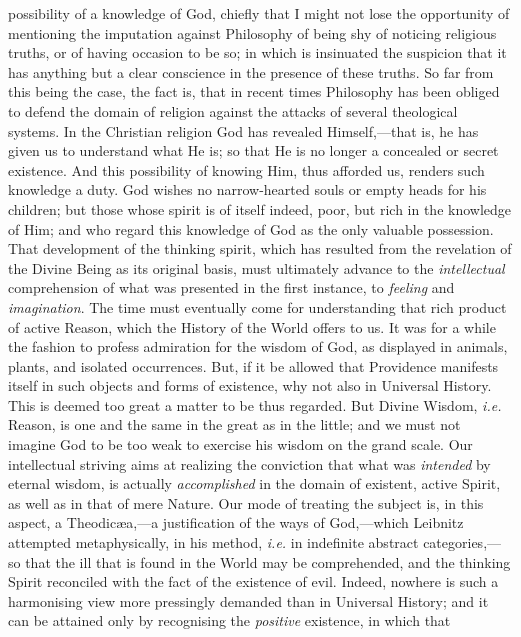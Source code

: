 possibility of a knowledge of God, chiefly that I might not lose the
opportunity of mentioning the imputation against Philosophy of being
shy of noticing religious truths, or of having occasion to be so; in
which is insinuated the suspicion that it has anything but a clear
conscience in the presence of these truths. So far from this being the
case, the fact is, that in recent times Philosophy has been obliged to
defend the domain of religion against the attacks of several
theological systems. In the Christian religion God has revealed
Himself,---that is, he has given us to understand what He is; so that
He is no longer a concealed or secret existence. And this possibility
of knowing Him, thus afforded us, renders such knowledge a duty. God
wishes no narrow-hearted souls or empty heads for his children; but
those whose spirit is of itself indeed, poor, but rich in the
knowledge of Him; and who regard this knowledge of  God as
the only valuable possession. That development of the thinking spirit,
which has resulted from the revelation of the Divine Being as its
original basis, must ultimately advance to the \textit{intellectual}
comprehension of what was presented in the first instance, to
\textit{feeling} and \textit{imagination}. The time must eventually
come for understanding that rich product of active Reason, which the
History of the World offers to us. It was for a while the fashion to
profess admiration for the wisdom of God, as displayed in animals,
plants, and isolated occurrences. But, if it be allowed that
Providence manifests itself in such objects and forms of existence,
why not also in Universal History. This is deemed too great a matter
to be thus regarded. But Divine Wisdom, \textit{i.e.} Reason, is one
and the same in the great as in the little; and we must not imagine
God to be too weak to exercise his wisdom on the grand scale. Our
intellectual striving aims at realizing the conviction that what was
\textit{intended} by eternal wisdom, is actually \textit{accomplished}
in the domain of existent, active Spirit, as well as in that of mere
Nature. Our mode of treating the subject is, in this aspect, a
Theodic\ae a,---a justification of the ways of God,---which Leibnitz
attempted metaphysically, in his method, \textit{i.e.} in indefinite
abstract categories,---so that the ill that is found in the World may
be comprehended, and the thinking Spirit reconciled with the fact of
the existence of evil. Indeed, nowhere is such a harmonising view more
pressingly demanded than in Universal History; and it can be attained
only by recognising the \textit{positive} existence, in which that
